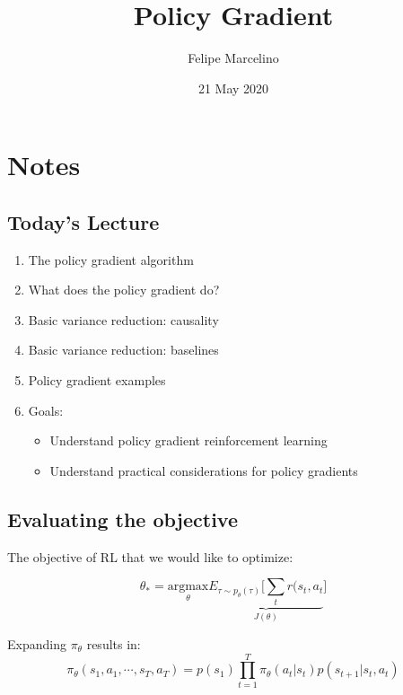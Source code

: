 \documentclass[]{article}
\begin{document}
\title{Policy Gradient}
\author{Felipe Marcelino}
\date{21 May 2020}
\maketitle

\section{Notes}


\subsection*{Today's Lecture }%
\label{sub:Slide 3}

\begin{enumerate}
    \item The policy gradient algorithm
    \item What does the policy gradient do?
    \item Basic variance reduction: causality
    \item Basic variance reduction: baselines
    \item Policy gradient examples
    \item Goals:
        \begin{itemize}
            \item Understand policy gradient reinforcement learning
            \item Understand practical considerations for policy gradients
        \end{itemize}
\end{enumerate}

\subsection*{Evaluating the objective}%
\label{sub:Evaluating the objective}


\par The objective of RL that we would like to optimize: 

\begin{equation}
\label{eq:objective}
\theta_{*} = \underset{\theta}{\text{argmax}} \underbrace{E_{\tau \sim p_{\theta}(\tau)} \Big[
\sum_{t}r(s_{t},a_{t}}_{J(\theta)} \Big]
\end{equation}

Expanding $\pi_{\theta}$ results in:
\begin{equation}
    \label{eq:pitheta}
    \pi_{\theta}(s_1,a_1,\cdots,s_{T},a_{T}) = p(s_1) \prod_{t=1}^{T}\pi_{\theta}(a_{t}|s_{t})p(s_{t+1}|s_{t},a_{t})
\end{equation}
\end{document}

